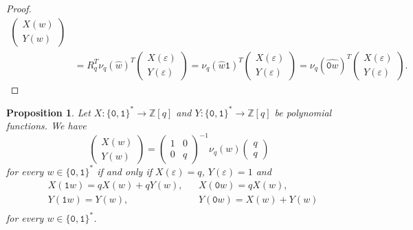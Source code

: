 \documentclass[a4paper,12pt]{amsart}
\newtheorem{proposition}[definition]{Proposition}
\newcommand{\Z}{\mathbb{Z}}
\newcommand{\0}{\mathtt{0}}
\newcommand{\1}{\mathtt{1}}
\newcommand{\2}{\mathtt{2}}
\newcommand{\3}{\mathtt{3}}
\begin{document}
\begin{proof}
\begin{align*}
        \left(\begin{array}{r}
        X(w)\\
        Y(w)
        \end{array}\right)\\
        &= R_q^T
          \nu_q(\widehat{w})^T
          \left(\begin{array}{r} X(\varepsilon)\\ Y(\varepsilon) \end{array}\right)
        = \nu_q(\widehat{w}\1)^T
          \left(\begin{array}{r} X(\varepsilon)\\ Y(\varepsilon) \end{array}\right)
        = \nu_q(\widehat{\0 w})^T
          \left(\begin{array}{r} X(\varepsilon)\\ Y(\varepsilon) \end{array}\right).
    \end{align*}
    \end{proof}

    \begin{proposition}\label{prop:equivalent-conditions-Fq}
        Let
        $X:\{\0,\1\}^*\to\Z[q]$ and
        $Y:\{\0,\1\}^*\to\Z[q]$ be polynomial functions.
        We have
        \begin{equation*}
            \left(\begin{array}{r}
                X(w)\\
                Y(w)
            \end{array}\right)
            =
            \left(\begin{smallmatrix} 1 & 0 \\ 0 & q \end{smallmatrix}\right)^{-1}
            \nu_q(w)
            \left(\begin{array}{cc} q \\ q \end{array}\right)
        \end{equation*}
        for every $w\in\{\0,\1\}^*$
        if and only if
        $X(\varepsilon)=q$, $Y(\varepsilon)=1$ and
        \begin{equation}\label{eq:hypothesis-on-X-Y}
        \begin{aligned}
            &X(\1 w) =qX(w)+qY(w),
            &&X(\0 w) =qX(w),\\
            &Y(\1 w)  =Y(w),
            &&Y(\0 w)  =X(w)+Y(w)\\
        \end{aligned}
        \end{equation}
        for every $w\in\{\0,\1\}^*$.
    \end{proposition}
\end{document}
